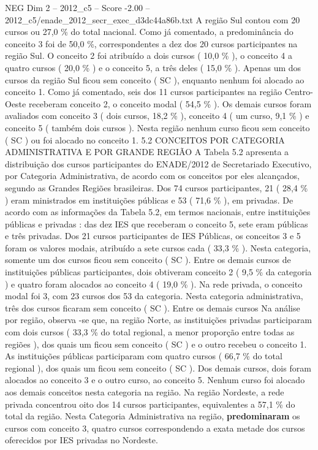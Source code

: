 \begin{textsample}{NEG Dim 2 – 2012\_c5 – Score -2.00 – 2012\_c5/enade\_2012\_secr\_exec\_d3dc44a86b.txt}
A região Sul contou com 20 cursos ou 27,0 \% do total nacional.
Como já comentado, a predominância do conceito 3 foi de 50,0 \%, correspondentes a dez dos 20 cursos participantes na região Sul.
O conceito 2 foi atribuído a dois cursos ( 10,0 \% ), o conceito 4 a quatro cursos ( 20,0 \% ) e o conceito 5, a três deles ( 15,0 \% ).
Apenas um dos cursos da região Sul ficou sem conceito ( SC ), enquanto nenhum foi alocado ao conceito 1.
Como já comentado, seis dos 11 cursos participantes na região Centro-Oeste receberam conceito 2, o conceito modal ( 54,5 \% ).
Os demais cursos foram avaliados com conceito 3 ( dois cursos, 18,2 \% ), conceito 4 ( um curso, 9,1 \% ) e conceito 5 ( também dois cursos ).
Nesta região nenhum curso ficou sem conceito ( SC ) ou foi alocado no conceito 1. 5.2 CONCEITOS POR CATEGORIA ADMINISTRATIVA E POR GRANDE REGIÃO A Tabela 5.2 apresenta a distribuição dos cursos participantes do ENADE/2012 de Secretariado Executivo, por Categoria Administrativa, de acordo com os conceitos por eles alcançados, segundo as Grandes Regiões brasileiras.
Dos 74 cursos participantes, 21 ( 28,4 \% ) eram ministrados em instituições públicas e 53 ( 71,6 \% ), em privadas.
De acordo com as informações da Tabela 5.2, em termos nacionais, entre instituições públicas e privadas : das dez IES que receberam o conceito 5, sete eram públicas e três privadas.
Dos 21 cursos participantes de IES Públicas, os conceitos 3 e 5 foram os valores modais, atribuído a sete cursos cada ( 33,3 \% ).
Nesta categoria, somente um dos cursos ficou sem conceito ( SC ).
Entre os demais cursos de instituições públicas participantes, dois obtiveram conceito 2 ( 9,5 \% da categoria ) e quatro foram alocados ao conceito 4 ( 19,0 \% ).
Na rede privada, o conceito modal foi 3, com 23 cursos dos 53 da categoria.
Nesta categoria administrativa, três dos cursos ficaram sem conceito ( SC ).
Entre os demais cursos Na análise por região, observa -se que, na região Norte, as instituições privadas participaram com dois cursos ( 33,3 \% do total regional, a menor proporção entre todas as regiões ), dos quais um ficou sem conceito ( SC ) e o outro recebeu o conceito 1.
As instituições públicas participaram com quatro cursos ( 66,7 \% do total regional ), dos quais um ficou sem conceito ( SC ).
Dos demais cursos, dois foram alocados ao conceito 3 e o outro curso, ao conceito 5.
Nenhum curso foi alocado aos demais conceitos nesta categoria na região.
Na região Nordeste, a rede privada concentrou oito dos 14 cursos participantes, equivalentes a 57,1 \% do total da região.
Nesta Categoria Administrativa na região, \textbf{predominaram} os cursos com conceito 3, quatro cursos correspondendo a exata metade dos cursos oferecidos por IES privadas no Nordeste.

\end{textsample}
